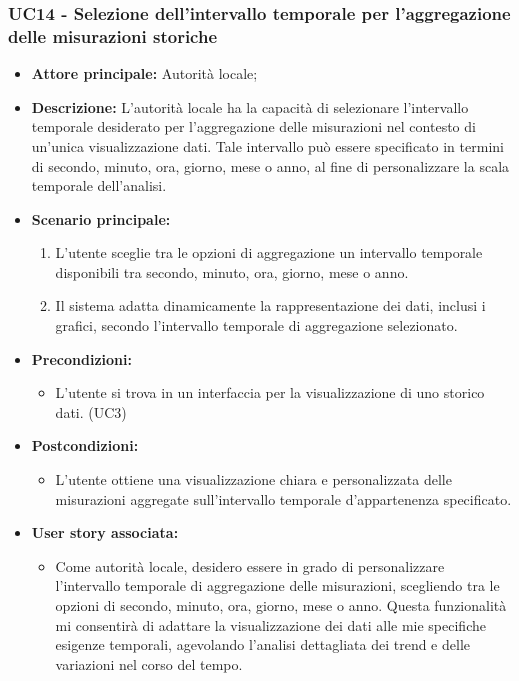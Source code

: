 \documentclass{article}
\begin{document}
\subsubsection{UC14 -  Selezione dell'intervallo temporale per l'aggregazione delle misurazioni storiche}
\begin{itemize}
    \item \textbf{Attore principale:} Autorità locale;
    \item \textbf{Descrizione:} L'autorità locale ha la capacità di selezionare l'intervallo temporale desiderato per l'aggregazione delle misurazioni nel contesto di un'unica visualizzazione dati. Tale intervallo può essere specificato in termini di secondo, minuto, ora, giorno, mese o anno, al fine di personalizzare la scala temporale dell'analisi.
    \item \textbf{Scenario principale:}
          \begin{enumerate}
             \item L'utente sceglie tra le opzioni di aggregazione un intervallo temporale disponibili tra secondo, minuto, ora, giorno, mese o anno.
             \item Il sistema adatta dinamicamente la rappresentazione dei dati, inclusi i grafici, secondo l'intervallo temporale di aggregazione selezionato.
          \end{enumerate}
    \item \textbf{Precondizioni:}
          \begin{itemize}
              \item  L'utente si trova in un interfaccia per la visualizzazione di uno storico dati.  (UC3)
          \end{itemize}
    \item \textbf{Postcondizioni:}
          \begin{itemize}
              \item  L'utente ottiene una visualizzazione chiara e personalizzata delle misurazioni aggregate sull'intervallo temporale d'appartenenza specificato.
          \end{itemize}
    \item \textbf{User story associata:}
          \begin{itemize}
              \item Come autorità locale, desidero essere in grado di personalizzare l'intervallo temporale di aggregazione delle misurazioni, scegliendo tra le opzioni di secondo, minuto, ora, giorno, mese o anno. Questa funzionalità mi consentirà di adattare la visualizzazione dei dati alle mie specifiche esigenze temporali, agevolando l'analisi dettagliata dei trend e delle variazioni nel corso del tempo.
          \end{itemize}
\end{itemize}
\end{document}
